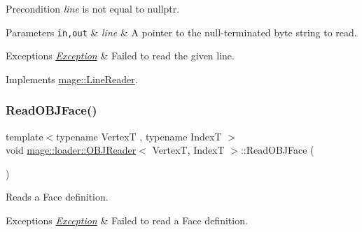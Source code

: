\begin{DoxyPrecond}{Precondition}
{\itshape line} is not equal to {\ttfamily nullptr}. 
\end{DoxyPrecond}

\begin{DoxyParams}[1]{Parameters}
\mbox{\tt in,out}  & {\em line} & A pointer to the null-\/terminated byte string to read. \\
\hline
\end{DoxyParams}

\begin{DoxyExceptions}{Exceptions}
{\em \hyperlink{classmage_1_1_exception}{Exception}} & Failed to read the given line. \\
\hline
\end{DoxyExceptions}


Implements \hyperlink{classmage_1_1_line_reader_acfb2f7279ec77d070a86d7db812d4745}{mage\+::\+Line\+Reader}.

\hypertarget{classmage_1_1loader_1_1_o_b_j_reader_a46b46fd7f1708be7db0d760e41fe959e}{}\label{classmage_1_1loader_1_1_o_b_j_reader_a46b46fd7f1708be7db0d760e41fe959e} 
\subsubsection{\texorpdfstring{Read\+O\+B\+J\+Face()}{ReadOBJFace()}}
{\footnotesize\ttfamily template$<$typename VertexT , typename IndexT $>$ \\
void \hyperlink{classmage_1_1loader_1_1_o_b_j_reader}{mage\+::loader\+::\+O\+B\+J\+Reader}$<$ VertexT, IndexT $>$\+::Read\+O\+B\+J\+Face (\begin{DoxyParamCaption}{ }\end{DoxyParamCaption})\hspace{0.3cm}{\ttfamily [private]}}

Reads a Face definition.


\begin{DoxyExceptions}{Exceptions}
{\em \hyperlink{classmage_1_1_exception}{Exception}} & Failed to read a Face definition. \\
\hline
\end{DoxyExceptions}
\hypertarget{classmage_1_1loader_1_1_o_b_j_reader_a7e647974904ac60f1b2e0276669957eb}{}\label{classmage_1_1loader_1_1_o_b_j_reader_a7e647974904ac60f1b2e0276669957eb} 
